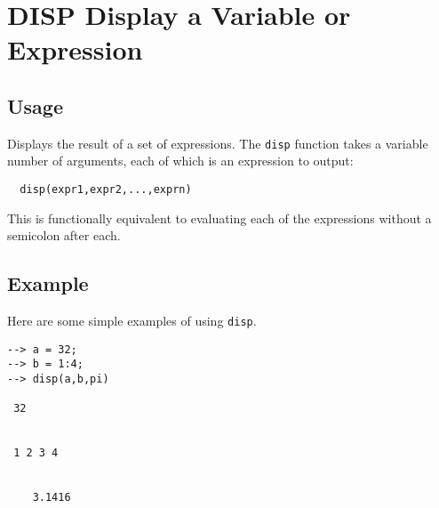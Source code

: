 \section{DISP Display a Variable or Expression}

\subsection{Usage}

Displays the result of a set of expressions.  The \verb|disp| function
takes a variable number of arguments, each of which is an expression
to output:
\begin{verbatim}
  disp(expr1,expr2,...,exprn)
\end{verbatim}
This is functionally equivalent to evaluating each of the expressions
without a semicolon after each.
\subsection{Example}

Here are some simple examples of using \verb|disp|.
\begin{verbatim}
--> a = 32;
--> b = 1:4;
--> disp(a,b,pi)

 32 


 1 2 3 4 


    3.1416 
\end{verbatim}
